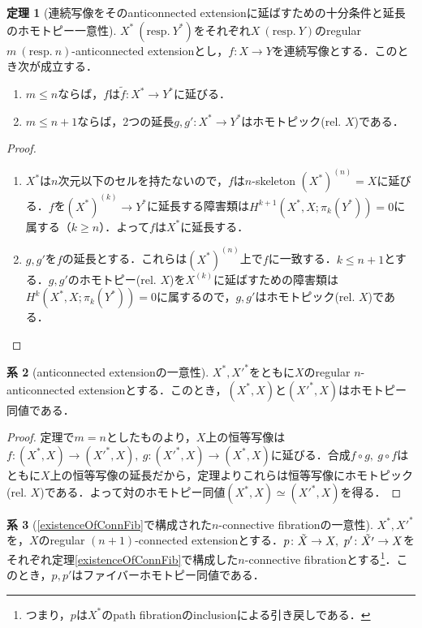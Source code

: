 \documentclass[a4paper,11pt]{jsarticle}
\theoremstyle{definition}
\newtheorem{thm}{定理}[section]
\newtheorem{cor}[thm]{系}
\begin{document}
\begin{thm}[連続写像をそのanticonnected extensionに延ばすための十分条件と延長のホモトピー一意性]
  $X^*\ (\mathrm{resp.\ }Y^*)$をそれぞれ$X\ (\mathrm{resp.\ }Y)$のregular $m\ (\mathrm{resp.\ }n)$-anticonnected extensionとし，$f\colon X\to Y$を連続写像とする．このとき次が成立する．
  \begin{enumerate}[(1)]
    \item $m\le n$ならば，$f$は$\tilde{f}\colon X^*\to Y^*$に延びる．
    \item $m\le n+1$ならば，2つの延長$g,g'\colon X^*\to Y^*$はホモトピック(rel. $X$)である．
  \end{enumerate}  
\end{thm}
\begin{proof}
  \begin{enumerate}[(1)]
    \item $X^*$は$n$次元以下のセルを持たないので，$f$は$n$-skeleton $(X^*)^{(n)}=X$に延びる．$f$を$(X^*)^{(k)}\to Y^*$に延長する障害類は$H^{k+1}(X^*,X;\pi_k(Y^*))=0$に属する（$k\ge n$）．よって$f$は$X^*$に延長する．
    \item $g,g'$を$f$の延長とする．これらは$(X^*)^{(n)}$上で$f$に一致する．$k\le n+1$とする．$g,g'$のホモトピー(rel. $X$)を$X^{(k)}$に延ばすための障害類は$H^k(X^*,X;\pi_k(Y^*))=0$に属するので，$g,g'$はホモトピック(rel. $X$)である．
  \end{enumerate}
\end{proof}
\begin{cor}[anticonnected extensionの一意性]
$X^*,X'^*$をともに$X$のregular $n$-anticonnected extensionとする．このとき，$(X^*,X)$と$(X'^*,X)$はホモトピー同値である．
\end{cor}
\begin{proof}
  定理で$m=n$としたものより，$X$上の恒等写像は$f\colon (X^*,X)\to (X'^*,X),\ g\colon (X'^*,X)\to (X^*,X)$に延びる．合成$f\circ g,\ g\circ f$はともに$X$上の恒等写像の延長だから，定理よりこれらは恒等写像にホモトピック(rel. $X$)である．よって対のホモトピー同値$(X^*,X)\simeq (X'^*,X)$を得る．
\end{proof}
\begin{cor}[\ref{existenceOfConnFib}で構成された$n$-connective fibrationの一意性]

  $X^*,X'^*$を，$X$のregular $(n+1)$-connected extensionとする．$p\colon \Tilde{X}\to X,\ p'\colon \tilde{X'}\to X$をそれぞれ定理\ref{existenceOfConnFib}で構成した$n$-connective fibrationとする\footnote{つまり，$p$は$X^*$のpath fibrationのinclusionによる引き戻しである．}．このとき，$p,p'$はファイバーホモトピー同値である．
\end{cor}
\end{document}
